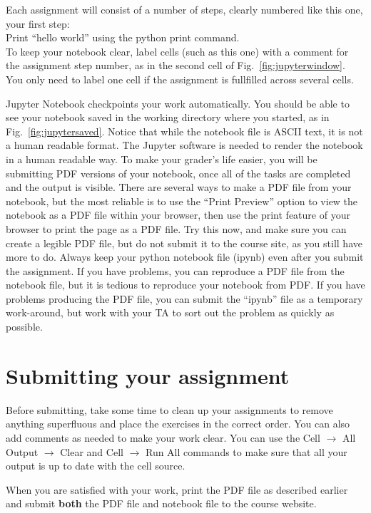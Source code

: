 Each assignment will consist of a number of steps, clearly numbered like this one, your first step:\\

\plot Print ``hello world'' using the python print command.\\

\noindent
To keep your notebook clear, label cells (such as this one) with a
comment for the assignment step number, as in the second cell of
Fig.~\ref{fig:jupyterwindow}.  You only need to label one cell if the
assignment is fullfilled across several cells.

Jupyter Notebook checkpoints your work automatically.  You should be
able to see your notebook saved in the working directory where you
started, as in Fig.~\ref{fig:jupytersaved}.  Notice that while the
notebook file is ASCII text, it is not a human readable format.  The
Jupyter software is needed to render the notebook in a human readable
way.  To make your grader's life easier, you will be submitting PDF
versions of your notebook, once all of the tasks are completed and the
output is visible.  There are several ways to make a PDF file from
your notebook, but the most reliable is to use the ``Print Preview''
option to view the notebook as a PDF file within your browser, then
use the print feature of your browser to print the page as a PDF file.
Try this now, and make sure you can create a legible PDF file, but do
not submit it to the course site, as you still have more to do.
Always keep your python notebook file (ipynb) even after you submit
the assignment.  If you have problems, you can reproduce a PDF file
from the notebook file, but it is tedious to reproduce your notebook
from PDF.  If you have problems producing the PDF file, you can submit
the ``ipynb'' file as a temporary work-around, but work with your TA
to sort out the problem as quickly as possible.

\section{Submitting your assignment}

Before submitting, take some time to clean up your assignments to
remove anything superfluous and place the exercises in the correct
order.  You can also add comments as needed to make your work clear.
You can use the Cell $\to$ All Output $\to$ Clear and Cell $\to$ Run
All commands to make sure that all your output is up to date with the
cell source.

When you are satisfied with your work, print the PDF file as described
earlier and submit {\bf both} the PDF file and notebook file to the
course website.









